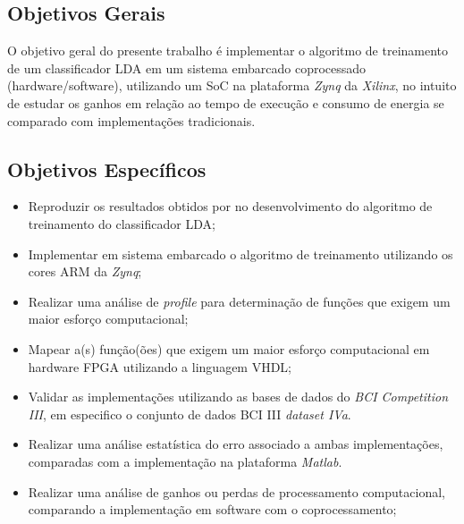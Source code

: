 \subsection{Objetivos Gerais}

	O objetivo geral do presente trabalho é implementar o algoritmo de treinamento de um classificador LDA em um sistema embarcado coprocessado (hardware/software), utilizando um SoC na plataforma \textit{Zynq} da \textit{Xilinx}, no intuito de estudar os ganhos em relação ao tempo de execução e consumo de energia se comparado com implementações tradicionais.

\subsection{Objetivos Específicos}

\begin{itemize}
	\item Reproduzir os resultados obtidos por \cite{F.Lotte} no desenvolvimento do algoritmo de treinamento do classificador LDA;

	\item Implementar em sistema embarcado o algoritmo de treinamento utilizando os cores ARM da \textit{Zynq};
	
	\item Realizar uma análise de \textit{profile} para determinação de funções que exigem um maior esforço computacional;
	
	\item Mapear a(s) função(ões) que exigem um maior esforço computacional em hardware FPGA utilizando a linguagem VHDL;
	

	\item Validar as implementações utilizando as bases de dados do \textit{BCI Competition III}, em especifico o conjunto de dados BCI III \textit{dataset IVa}.
	
	\item Realizar uma análise estatística do erro associado a ambas implementações, comparadas com a implementação na plataforma \textit{Matlab}.
	
	\item Realizar uma análise de ganhos ou perdas de processamento computacional, comparando a implementação em software com o coprocessamento;
\end{itemize}
